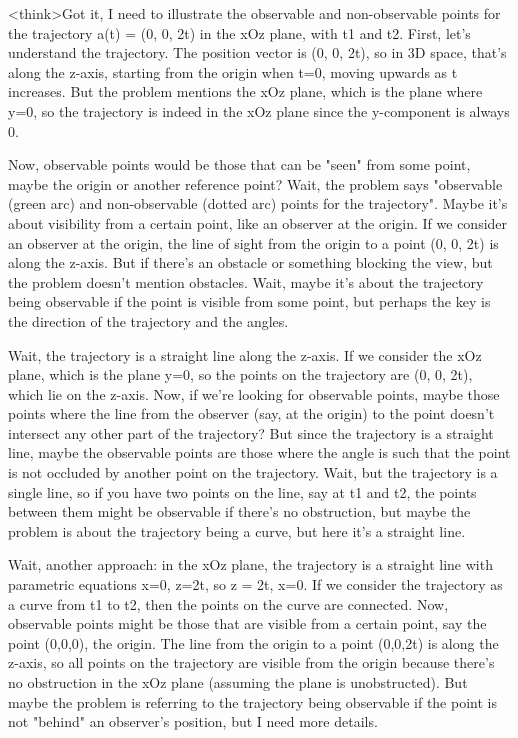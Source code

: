 <think>Got it, I need to illustrate the observable and non-observable points for the trajectory a(t) = (0, 0, 2t) in the xOz plane, with t1 and t2. First, let's understand the trajectory. The position vector is (0, 0, 2t), so in 3D space, that's along the z-axis, starting from the origin when t=0, moving upwards as t increases. But the problem mentions the xOz plane, which is the plane where y=0, so the trajectory is indeed in the xOz plane since the y-component is always 0.

Now, observable points would be those that can be "seen" from some point, maybe the origin or another reference point? Wait, the problem says "observable (green arc) and non-observable (dotted arc) points for the trajectory". Maybe it's about visibility from a certain point, like an observer at the origin. If we consider an observer at the origin, the line of sight from the origin to a point (0, 0, 2t) is along the z-axis. But if there's an obstacle or something blocking the view, but the problem doesn't mention obstacles. Wait, maybe it's about the trajectory being observable if the point is visible from some point, but perhaps the key is the direction of the trajectory and the angles.

Wait, the trajectory is a straight line along the z-axis. If we consider the xOz plane, which is the plane y=0, so the points on the trajectory are (0, 0, 2t), which lie on the z-axis. Now, if we're looking for observable points, maybe those points where the line from the observer (say, at the origin) to the point doesn't intersect any other part of the trajectory? But since the trajectory is a straight line, maybe the observable points are those where the angle is such that the point is not occluded by another point on the trajectory. Wait, but the trajectory is a single line, so if you have two points on the line, say at t1 and t2, the points between them might be observable if there's no obstruction, but maybe the problem is about the trajectory being a curve, but here it's a straight line.

Wait, another approach: in the xOz plane, the trajectory is a straight line with parametric equations x=0, z=2t, so z = 2t, x=0. If we consider the trajectory as a curve from t1 to t2, then the points on the curve are connected. Now, observable points might be those that are visible from a certain point, say the point (0,0,0), the origin. The line from the origin to a point (0,0,2t) is along the z-axis, so all points on the trajectory are visible from the origin because there's no obstruction in the xOz plane (assuming the plane is unobstructed). But maybe the problem is referring to the trajectory being observable if the point is not "behind" an observer's position, but I need more details.

